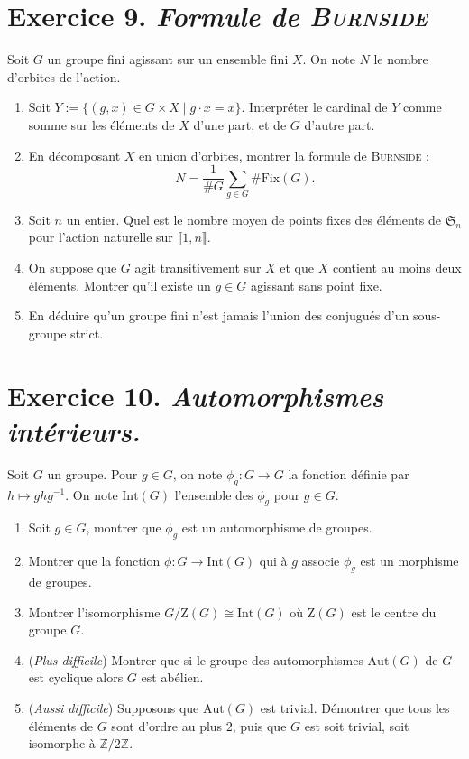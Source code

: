 \documentclass[./main]{subfiles}
\begin{document}
  \section{Exercice 9. \textit{Formule de \textsc{\textit{Burnside}}}}
  \begin{enonce}
    Soit $G$ un groupe fini agissant sur un ensemble fini $X$. On note $N$ le nombre d'orbites de l'action.
    \begin{enumerate}
      \item Soit $Y := \{(g,x)\in G \times X \mid g \cdot x = x\}$.
        Interpréter le cardinal de $Y$ comme somme sur les éléments de $X$ d'une part, et de $G$ d'autre part.
      \item En décomposant $X $ en union d'orbites, montrer la formule de \textsc{Burnside} : \[
          N = \frac{1}{\#G}\sum_{g \in G} \# \mathrm{Fix}(G)
        .\]
      \item Soit $n$ un entier. Quel est le nombre moyen de points fixes des éléments de $\mathfrak{S}_n$ pour l'action naturelle sur $\llbracket 1, n \rrbracket$.
      \item On suppose que $G$ agit transitivement sur $X$ et que $X$ contient au moins deux éléments. Montrer qu'il existe un $g \in G$ agissant sans point fixe.
      \item En déduire qu'un groupe fini n'est jamais l'union des conjugués d'un sous-groupe strict.
    \end{enumerate}
  \end{enonce}

  \section{Exercice 10. \textit{Automorphismes intérieurs.}}
  \begin{enonce}
    Soit $G$ un groupe. Pour $g \in G$, on note $\phi_g : G \to G$ la fonction définie par $h \mapsto ghg^{-1}$.
    On note $\mathrm{Int}(G)$ l'ensemble des $\phi_g$ pour $g \in G$.
    \begin{enumerate}
      \item Soit $g \in G$, montrer que $\phi_g$ est un automorphisme de groupes.
      \item Montrer que la fonction $\phi : G \to \mathrm{Int}(G)$ qui à $g$ associe $\phi_g$ est un morphisme de groupes.
      \item Montrer l'isomorphisme $G / \mathrm{Z}(G) \cong \mathrm{Int}(G)$ où $\mathrm{Z}(G)$ est le centre du groupe $G$.
      \item (\textit{Plus difficile}) Montrer que si le groupe des automorphismes $\mathrm{Aut}(G)$ de $G$ est cyclique alors $G$ est abélien.
      \item (\textit{Aussi difficile}) Supposons que $\mathrm{Aut}(G)$ est trivial. Démontrer que tous les éléments de $G$ sont d'ordre au plus $2$, puis que $G$ est soit trivial, soit isomorphe à $\mathds{Z} / 2 \mathds{Z}$.
    \end{enumerate}
  \end{enonce}
\end{document}

